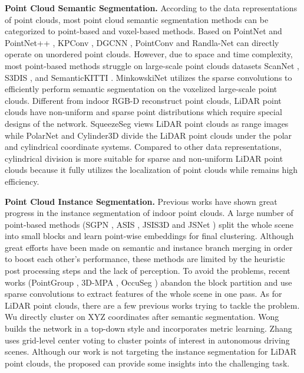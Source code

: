 \documentclass[final]{cvpr}
\begin{document}
\noindent\textbf{Point Cloud Semantic Segmentation.}
According to the data representations of point clouds, most point cloud semantic segmentation methods can be
categorized to point-based and voxel-based methods.
Based on PointNet \cite{qi2017pointnet} and PointNet++ \cite{qi2017pointnet++}, KPConv \cite{thomas2019kpconv},
DGCNN \cite{wang2019dynamic}, PointConv \cite{wu2019pointconv} and Randla-Net \cite{hu2020randla} can directly operate
on unordered point clouds.
However, due to space and time complexity, most point-based methods struggle on large-scale point clouds datasets
\eg ScanNet \cite{dai2017scannet}, S3DIS \cite{armeni20163d}, and SemanticKITTI \cite{behley2019semantickitti}.
MinkowskiNet \cite{choy20194d} utilizes the sparse convolutions to efficiently perform semantic segmentation on the voxelized
large-scale point clouds.
Different from indoor RGB-D reconstruct point clouds, LiDAR point clouds have non-uniform and sparse
point distributions which require special designs of the network.
SqueezeSeg \cite{wu2018squeezeseg} views LiDAR point clouds as range images while PolarNet \cite{zhang2020polarnet} and Cylinder3D \cite{zhou2020cylinder3d} divide the LiDAR point clouds under the polar and cylindrical coordinate systems.
Compared to other data representations, cylindrical division is more suitable for sparse and non-uniform LiDAR
point clouds because it
fully utilizes the localization of point clouds while remains high efficiency.


\noindent\textbf{Point Cloud Instance Segmentation.}
Previous works have shown great progress in the instance segmentation of indoor point clouds.
A large number of point-based methods (\eg SGPN \cite{wang2018sgpn}, ASIS \cite{wang2019associatively}, JSIS3D \cite{pham2019jsis3d} and JSNet \cite{zhao2020jsnet}) split the whole scene into
small blocks and learn point-wise embeddings for final clustering.
Although great efforts have been made on semantic and instance branch merging in order to boost each
other's performance, these methods are limited by the heuristic post processing steps and the lack of perception.
To avoid the problems, recent works (\eg PointGroup \cite{jiang2020pointgroup}, 3D-MPA \cite{engelmann20203d}, OccuSeg \cite{han2020occuseg}) abandon the block partition
and use sparse convolutions to extract features of the whole scene in one pass.
As for LiDAR point clouds, there are a few previous works \cite{hu2020randla, Wong2019IdentifyingUI, wu2018squeezeseg, 2020LiDARSeg} trying to tackle the problem.
Wu \etal \cite{wu2018squeezeseg} directly cluster on XYZ coordinates after semantic segmentation.
Wong \etal \cite{Wong2019IdentifyingUI} builds the network in a top-down style and incorporates metric learning.
Zhang \etal \cite{2020LiDARSeg} uses grid-level center voting to cluster points of interest in autonomous driving
scenes.
Although our work is not targeting the instance segmentation for LiDAR point clouds, the proposed \nickname{} can provide some insights into the challenging task.
\end{document}
